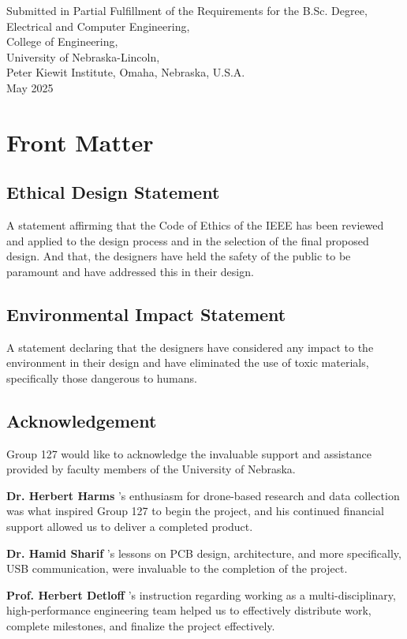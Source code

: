 \documentclass[12pt]{article}
\makeatletter
\newcommand\teenyparagraph[1]{%
  \@tempswatrue
  \if@nobreak\@tempswafalse\fi
  \if@noskipsec \leavevmode \fi
  \par
  \@nobreakfalse
  \everypar{}%
  \protected@edef\@svsec{\@seccntformat{paragraph}}%
  \@tempswafalse
  \@xsect{3.25ex \@plus 1ex \@minus .2ex}%
  {\normalfont\normalsize\bfseries #1}%
}
\makeatother
\begin{document}
\begin{titlepage}
\begin{center}
        \small Submitted in Partial Fulfillment of the Requirements for the B.Sc. Degree,\\
        \small Electrical and Computer Engineering,\\
        \small College of Engineering,\\
        \small University of Nebraska-Lincoln,\\
        \small Peter Kiewit Institute, Omaha, Nebraska, U.S.A.\\
        \small May 2025\\
    \end{center}
    \thispagestyle{empty}
\end{titlepage}

\newpage

\section*{Front Matter}

\subsection*{Ethical Design Statement}
A statement affirming that the Code of Ethics of the IEEE has been reviewed and applied to the design process and in the selection of the final proposed design. And that, the designers have held the safety of the public to be paramount and have addressed this in their design.

\subsection*{Environmental Impact Statement}
A statement declaring that the designers have considered any impact to the environment in their design and have eliminated the use of toxic materials, specifically those dangerous to humans.



\subsection*{Acknowledgement}

Group 127 would like to acknowledge the invaluable support and assistance provided by faculty members of the University of Nebraska.
\teenyparagraph{Dr. Herbert Harms}'s enthusiasm for drone-based research and data collection was what inspired Group 127 to begin the project, and his continued financial support allowed us to deliver a completed product.
\teenyparagraph{Dr. Hamid Sharif}'s lessons on PCB design, architecture, and more specifically, USB communication, were invaluable to the completion of the project.
\teenyparagraph{Prof. Herbert Detloff}'s instruction regarding working as a multi-disciplinary, high-performance engineering team helped us to effectively distribute work, complete milestones, and finalize the project effectively.
\end{document}
